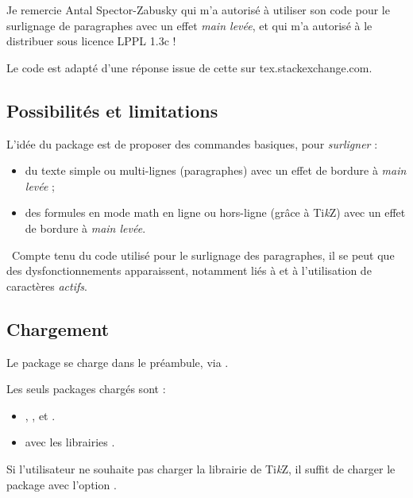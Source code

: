 \documentclass[french,11pt,a4paper]{article}
\providecommand\tikzlogo{Ti\textit{k}Z}
\let\TikZ\tikzlogo
\begin{document}
Je remercie Antal Spector-Zabusky qui m'a autorisé à utiliser son code pour le surlignage de paragraphes avec un effet \textit{main levée}, et qui m'a autorisé à le distribuer sous licence \textsf{LPPL 1.3c} !

Le code est adapté d'une réponse issue de cette  \href{https://tex.stackexchange.com/questions/5959/cool-text-highlighting-in-latex}{} sur \textsf{tex.stackexchange.com}.

\pagebreak

\subsection{Possibilités et limitations}

L'idée du package  est de proposer des commandes basiques, pour \textit{surligner} :

\begin{itemize}
	\item du texte simple ou multi-lignes (paragraphes) avec un effet de bordure à \textit{main levée} ;
	\item des formules en mode math en ligne ou hors-ligne (grâce à \TikZ) avec un effet de bordure à \textit{main levée}.
\end{itemize}

{\small\faBomb}~Compte tenu du code utilisé pour le surlignage des paragraphes, il se peut que des dysfonctionnements apparaissent, notamment liés à  et à l'utilisation de caractères \textit{actifs}.

\subsection{Chargement}

Le package se charge dans le préambule, via .

Les seuls packages chargés sont :

\begin{itemize}
	\item {}, ,  et .
	\item {} avec les librairies .
\end{itemize}

Si l'utilisateur ne souhaite pas charger la librairie  de \TikZ, il suffit de charger le package avec l'option \MontreCode{[nobabel]}.
\end{document}
